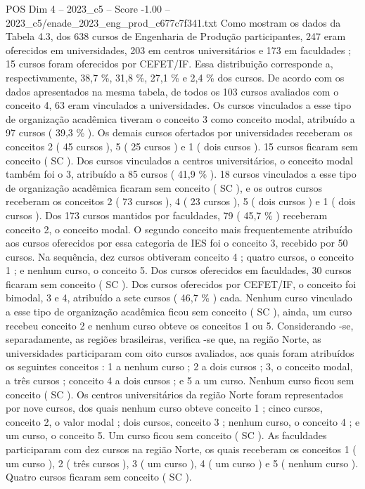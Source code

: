 \begin{textsample}{POS Dim 4 – 2023\_c5 – Score -1.00 – 2023\_c5/enade\_2023\_eng\_prod\_c677c7f341.txt}
Como mostram os dados da Tabela 4.3, dos 638 cursos de Engenharia de Produção participantes, 247 eram oferecidos em universidades, 203 em centros universitários e 173 em faculdades ; 15 cursos foram oferecidos por CEFET/IF.
Essa distribuição corresponde a, respectivamente, 38,7 \%, 31,8 \%, 27,1 \% e 2,4 \% dos cursos.
De acordo com os dados apresentados na mesma tabela, de todos os 103 cursos avaliados com o conceito 4, 63 eram vinculados a universidades.
Os cursos vinculados a esse tipo de organização acadêmica tiveram o conceito 3 como conceito modal, atribuído a 97 cursos ( 39,3 \% ).
Os demais cursos ofertados por universidades receberam os conceitos 2 ( 45 cursos ), 5 ( 25 cursos ) e 1 ( dois cursos ). 15 cursos ficaram sem conceito ( SC ).
Dos cursos vinculados a centros universitários, o conceito modal também foi o 3, atribuído a 85 cursos ( 41,9 \% ). 18 cursos vinculados a esse tipo de organização acadêmica ficaram sem conceito ( SC ), e os outros cursos receberam os conceitos 2 ( 73 cursos ), 4 ( 23 cursos ), 5 ( dois cursos ) e 1 ( dois cursos ).
Dos 173 cursos mantidos por faculdades, 79 ( 45,7 \% ) receberam conceito 2, o conceito modal.
O segundo conceito mais frequentemente atribuído aos cursos oferecidos por essa categoria de IES foi o conceito 3, recebido por 50 cursos.
Na sequência, dez cursos obtiveram conceito 4 ; quatro cursos, o conceito 1 ; e nenhum curso, o conceito 5.
Dos cursos oferecidos em faculdades, 30 cursos ficaram sem conceito ( SC ).
Dos cursos oferecidos por CEFET/IF, o conceito foi bimodal, 3 e 4, atribuído a sete cursos ( 46,7 \% ) cada.
Nenhum curso vinculado a esse tipo de organização acadêmica ficou sem conceito ( SC ), ainda, um curso recebeu conceito 2 e nenhum curso obteve os conceitos 1 ou 5.
Considerando -se, separadamente, as regiões brasileiras, verifica -se que, na região Norte, as universidades participaram com oito cursos avaliados, aos quais foram atribuídos os seguintes conceitos : 1 a nenhum curso ; 2 a dois cursos ; 3, o conceito modal, a três cursos ; conceito 4 a dois cursos ; e 5 a um curso.
Nenhum curso ficou sem conceito ( SC ).
Os centros universitários da região Norte foram representados por nove cursos, dos quais nenhum curso obteve conceito 1 ; cinco cursos, conceito 2, o valor modal ; dois cursos, conceito 3 ; nenhum curso, o conceito 4 ; e um curso, o conceito 5.
Um curso ficou sem conceito ( SC ).
As faculdades participaram com dez cursos na região Norte, os quais receberam os conceitos 1 ( um curso ), 2 ( três cursos ), 3 ( um curso ), 4 ( um curso ) e 5 ( nenhum curso ).
Quatro cursos ficaram sem conceito ( SC ).

\end{textsample}
